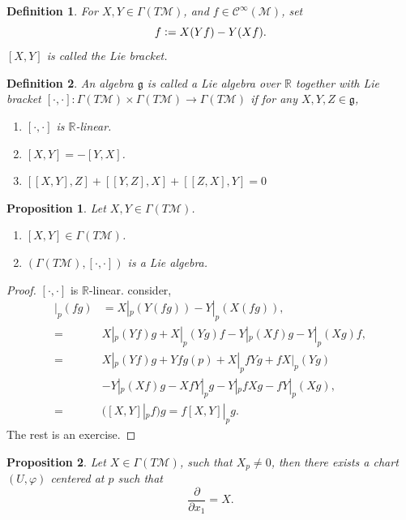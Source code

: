 \documentclass[10pt]{article}
\newtheorem{proposition}{Proposition}[section]
\newtheorem{definition}{Definition}[section]
\newcommand{\defeq}{\vcentcolon=}
\newcommand{\R}[0]{\mathbb{R}}
\newcommand{\M}[0]{\mathcal{M}}
\newcommand{\pd}[2]{{\frac {\partial #1} {\partial #2}}}
\begin{document}
\begin{definition}
  For $X,Y\in\Gamma(T\M)$, and $f\in\mathcal{C}^\infty(\M)$, set 
  \begin{equation*}
    [X,Y]f\defeq X(Yf) - Y(Xf).
  \end{equation*}
  $[X,Y]$ is called the Lie bracket. 
\end{definition}

\begin{definition}
  An algebra $\mathfrak{g}$ is called a Lie algebra over $\R$ together with Lie bracket $[\cdot,\cdot]:\Gamma(T\M)\times \Gamma(T\M)\to \Gamma(T\M)$ if for any $X,Y,Z\in\mathfrak{g}$,
  \begin{enumerate}
    \item $[\cdot,\cdot]$ is $\R$-linear.
    \item $[X,Y] = -[Y,X]$.
    \item $[[X,Y],Z]+[[Y,Z],X]+[[Z,X],Y] = 0$
  \end{enumerate}
\end{definition}

\begin{proposition}
  Let $X,Y\in\Gamma(T\M)$.
  \begin{enumerate}
    \item $[X,Y]\in\Gamma(T\M)$.
    \item $(\Gamma(T\M),[\cdot,\cdot])$ is a Lie algebra.
  \end{enumerate}
\end{proposition}

\begin{proof}
  $[\cdot,\cdot]$ is $\R$-linear. consider,
\begin{align*}
  [X,Y]|_p(fg) &= X|_p(Y(fg))-Y|_p(X(fg)),\\
   =& X|_p(Yf)g+X|_p(Yg)f - Y|_p(Xf)g-Y|_p(Xg)f,\\
   =& X|_p(Yf)g+Yfg(p)+X|_pf Yg+fX|_p(Yg) \\
  &- Y|_p(Xf)g-XfY|_pg-Y|_pfXg-fY|_p(Xg),\\
   =& ([X,Y]|_p f)g = f[X,Y]|_pg.
\end{align*}
The rest is an exercise.
\end{proof}

\begin{proposition}
  Let $X\in\Gamma(T\M)$, such that $X_p\not=0$, then there exists a chart $(U,\varphi)$ centered at $p$ such that 
  \begin{equation*}
    \pd{}{x_1} = X.
  \end{equation*}
\end{proposition}
\end{document}

